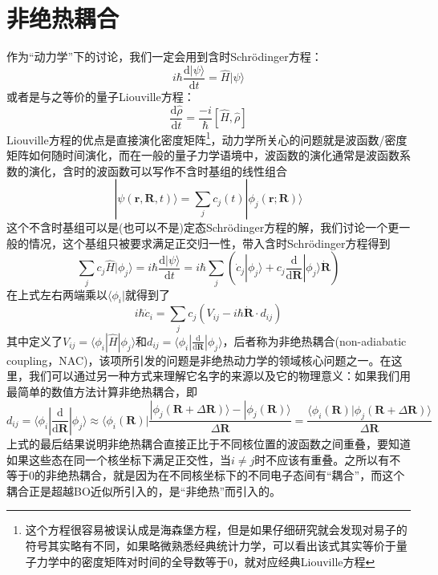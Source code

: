 \documentclass[12pt,a4paper,openany,twoside]{book}
\numberwithin{equation}{section}
\begin{document}
      \section{非绝热耦合}
        作为“动力学”下的讨论，我们一定会用到含时Schr\"odinger方程：
        \begin{equation}
          i \hbar \frac{\mathrm{d} | \psi \rangle}{\mathrm{d} t}=\hat{H} | \psi \rangle
        \end{equation}
        或者是与之等价的量子Liouville方程：
        \begin{equation}
          \frac{\mathrm{d} \hat{\rho}}{\mathrm{d} t}=\frac{-i}{\hbar}[\hat{H}, \hat{\rho}]
        \end{equation}
        Liouville方程的优点是直接演化密度矩阵\footnote{这个方程很容易被误认成是海森堡方程，但是如果仔细研究就会发现对易子的符号其实略有不同，如果略微熟悉经典统计力学，可以看出该式其实等价于量子力学中的密度矩阵对时间的全导数等于0，就对应经典Liouville方程}，动力学所关心的问题就是波函数/密度矩阵如何随时间演化，而在一般的量子力学语境中，波函数的演化通常是波函数系数的演化，含时的波函数可以写作不含时基组的线性组合
        \begin{equation}
          |\psi(\mathbf{r}, \mathbf{R}, t)\rangle=\sum_{j} c_{j}(t) |\phi_{j}(\mathbf{r} ; \mathbf{R})\rangle
          \label{linear combination}
        \end{equation}
        这个不含时基组可以是(也可以不是)定态Schr\"odinger方程的解，我们讨论一个更一般的情况，这个基组只被要求满足正交归一性，带入含时Schr\"odinger方程得到
        \begin{equation}
          \sum_j c_j \hat{H}|\phi_j\rangle=i \hbar \frac{\mathrm{d} | \psi \rangle}{\mathrm{d} t}=i \hbar\sum_j\left(\dot{c}_j|\phi_j\rangle+c_j\frac{\mathrm{d}}{\mathrm{d}\mathbf{R}}|\phi_j\rangle\dot{\mathbf{R}}\right)
        \end{equation}
        在上式左右两端乘以$\langle\phi_i|$就得到了
        \begin{equation}
          i \hbar \dot{c}_{i}=\sum_{j} c_{j}\left(V_{i j}-i \hbar \dot{\mathbf{R}} \cdot d_{i j}\right)
          \label{time-depend-coeff}
        \end{equation}
        其中定义了$V_{ij}=\langle\phi_i|\hat{H}|\phi_j\rangle$和$d_{ij}=\langle\phi_i|\frac{\mathrm{d}}{\mathrm{d}\mathbf{R}}|\phi_j\rangle$，后者称为非绝热耦合(non-adiabatic coupling，NAC)，该项所引发的问题是非绝热动力学的领域核心问题之一。在这里，我们可以通过另一种方式来理解它名字的来源以及它的物理意义：如果我们用最简单的数值方法计算非绝热耦合，即
        \begin{equation}
          d_{ij}=\langle\phi_i|\frac{\mathrm{d}}{\mathrm{d}\mathbf{R}}|\phi_j\rangle\approx\langle\phi_i(\mathbf{R})|\frac{|\phi_j(\mathbf{R}+\Delta\mathbf{R})\rangle-|\phi_j(\mathbf{R})\rangle}{\Delta\mathbf{R}}
          =\frac{\langle\phi_i(\mathbf{R})|\phi_j(\mathbf{R}+\Delta\mathbf{R})\rangle}{\Delta\mathbf{R}}
          \label{numerical dij}
        \end{equation}
        上式的最后结果说明非绝热耦合直接正比于不同核位置的波函数之间重叠，要知道如果这些态在同一个核坐标下满足正交性，当$i\neq j$时不应该有重叠。之所以有不等于0的非绝热耦合，就是因为在不同核坐标下的不同电子态间有“耦合”，而这个耦合正是超越BO近似所引入的，是“非绝热”而引入的。
\end{document}
